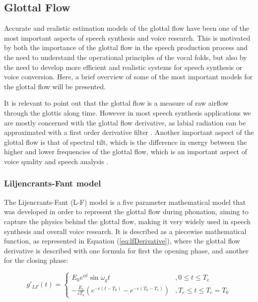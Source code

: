\subsection{Glottal Flow}

Accurate and realistic estimation models of the glottal flow have been one of the most important aspects of speech synthesis and voice research. This is motivated by both the importance of the glottal flow in the speech production process and the need to understand the operational principles of the vocal folds, but also by the need to develop more efficient and realistic systems for speech synthesis or voice conversion. Here, a brief overview of some of the most important models for the glottal flow will be presented.

It is relevant to point out that the glottal flow is a measure of raw airflow through the glottis along time. However in most speech synthesis applications we are mostly concerned with the glottal flow derivative, as labial radiation can be approximated with a first order derivative filter \cite{doval:hal-00368131, Murphy2011DigitalSP}. Another important aspect of the glottal flow is that of spectral tilt, which is the difference in energy between the higher and lower frequencies of the glottal flow, which is an important aspect of voice quality and speech analysis \cite{ferreira2018on}.



\subsubsection{Liljencrants-Fant model}

The Lijencrants-Fant (L-F) model \cite{fantFourparameterModelGlottal1985} is a five parameter mathematical model that was developed in order to represent the glottal flow during phonation, aiming to capture the physics behind the glottal flow, making it very widely used in speech synthesis and overall voice research. It is described as a piecewise mathematical function, as represented in Equation (\ref{eq:lfDerivative}), where the glottal flow derivative is described with one formula for first the opening phase, and another for the closing phase:

\begin{equation}
    g'_{LF}(t) = 
    \begin{cases}
        E_0 e^{\alpha t} \sin{\omega_g t} & , 0 \le t \le T_e \\
        - \frac{E_e}{\epsilon T_a} (e^{-\epsilon(t-T_0)} - e^{-\epsilon(T_0- T_e)}) & , T_e \le t \le T_c = T_0
    \end{cases}
    \label{eq:lfDerivative}
\end{equation}


